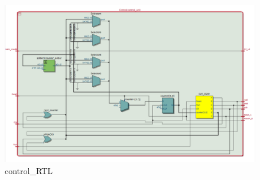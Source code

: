 \documentclass[12pt]{article}
\begin{document}
\begin{figure}[H]
    \centering
    \includegraphics[width=15cm]{control_RTL.png}
    \caption{control\_RTL}
\end{figure}
\end{document}
